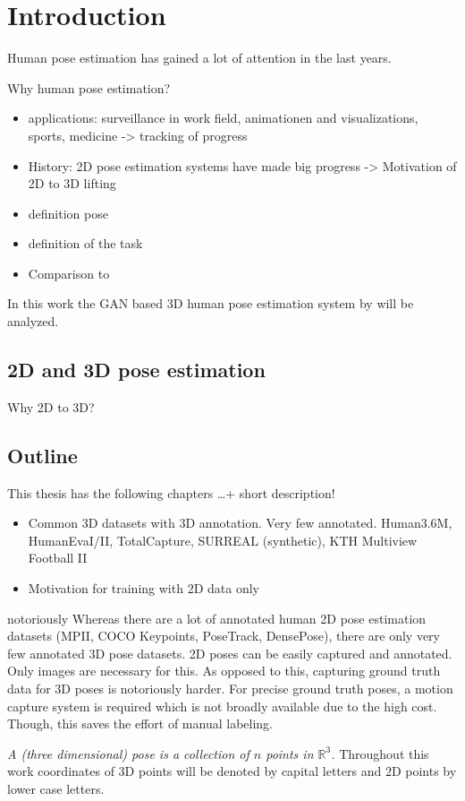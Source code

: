 \section{Introduction}

Human pose estimation has gained a lot of attention in the last years.

Why human pose estimation?


\begin{itemize}
	\item applications: surveillance in work field, animationen and visualizations, sports, medicine -> tracking of progress
	\item History: 2D pose estimation systems have made big progress -> Motivation of 2D to 3D lifting
	\item definition pose
	\item definition of the task
	\item Comparison to \citet{wandt19}
\end{itemize}

In this work the GAN based 3D human pose estimation system by \citet{drover18} will be analyzed.

\subsection{2D and 3D pose estimation}
Why 2D to 3D?


\subsection{Outline}
This thesis has the following chapters \dots + short description!


\begin{itemize}
	\item Common 3D datasets with 3D annotation. Very few annotated. Human3.6M, HumanEvaI/II, TotalCapture, SURREAL (synthetic), KTH Multiview Football II
	\item Motivation for training with 2D data only
\end{itemize}

notoriously
Whereas there are a lot of annotated human 2D pose estimation datasets (MPII, COCO Keypoints, PoseTrack, DensePose), there are only very few annotated 3D pose datasets. 
2D poses can be easily captured and annotated.
Only images are necessary for this.
As opposed to this, capturing ground truth data for 3D poses is notoriously harder.
For precise ground truth poses, a motion capture system is required which is not broadly available due to the high cost.
Though, this saves the effort of manual labeling.


\emph{A (three dimensional) \textit{pose} is a collection of $n$ points in $\mathbb{R}^3$.}
Throughout this work coordinates of 3D points will be denoted by capital letters and 2D points by lower case letters.
